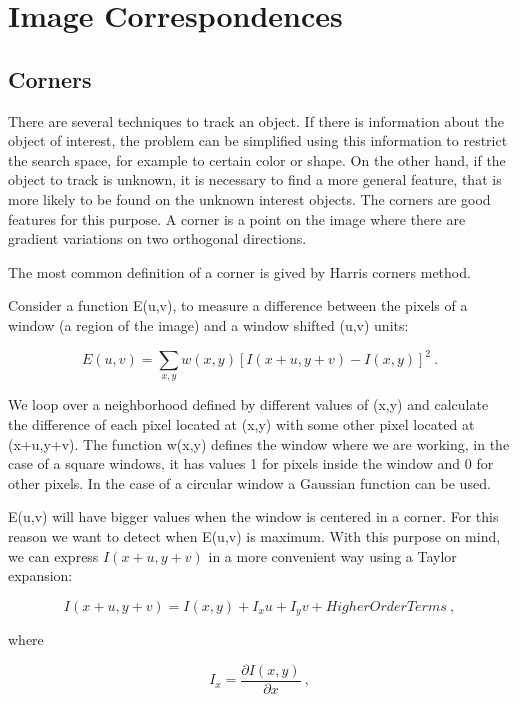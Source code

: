  


\section{Image Correspondences}

\subsection{Corners}

There are several techniques to track an object. If there is information about the object of interest, the problem 
can be simplified using this information to restrict the search space, for example to certain color or shape. On the other hand, if the object to track is unknown, it is necessary to find a more general feature, that is 
more likely to be found on the unknown interest objects. The corners are good features for this purpose. A corner 
is a point on the image where there are gradient variations on two orthogonal directions.

The most common definition of a corner is gived by Harris corners method.

Consider a function E(u,v), to measure a difference between the pixels of a window (a region of the image) and 
a window shifted (u,v) units:

\begin{equation}
E(u,v) = \sum\limits_{x,y} { w(x,y) [I(x + u, y +v) - I(x,y)]^2  }\ .
\label{eq:harris1}
\end{equation}

We loop over a neighborhood defined by different values of (x,y) and calculate 
the difference of each pixel located at (x,y) with some other pixel located at (x+u,y+v). 
The function w(x,y) defines the window where we are working, in the case of a square windows, 
it has values 1 for pixels inside the window and 0 for other pixels. In the case of a circular 
window a Gaussian function can be used. 

E(u,v) will have bigger values when the window is centered in a corner. For this reason we want 
to detect when E(u,v) is maximum. With this purpose on mind, we can express $I(x + u, y +v)$ in a more convenient
 way using a Taylor expansion:

$$
I(x+u,y +v) = I(x,y) + I_xu + I_yv + Higher Order Terms \ ,
$$ 

\noindent where 

$$
I_x = \frac{\partial{I(x,y)}}{\partial{x}}\ ,
$$

